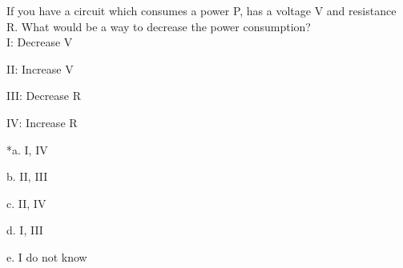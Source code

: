 
If you have a circuit which consumes a power P, has a voltage V and resistance R. What would be a way to decrease the power consumption? \\

I: Decrease V

II: Increase V

III: Decrease R

IV: Increase R

*a. I, IV

b. II, III

c. II, IV

d. I, III

e. I do not know \\
